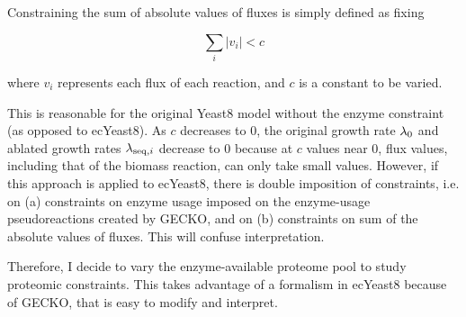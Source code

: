 Constraining the sum of absolute values of fluxes is simply defined as fixing

\begin{equation}
  \sum_{i} |v_{i}| < c
  \label{eq:model-constrain-sumfluxes}
\end{equation}

where $v_{i}$ represents each flux of each reaction, and $c$ is a constant to be varied.

This is reasonable for the original Yeast8 model without the enzyme constraint (as opposed to ecYeast8).
As $c$ decreases to 0, the original growth rate $\lambda_{0}$ and ablated growth rates $\lambda_{\mathrm{seq},i}$ decrease to 0 because at $c$ values near 0, flux values, including that of the biomass reaction, can only take small values.
However, if this approach is applied to ecYeast8,
there is double imposition of constraints, i.e.\: on
(a) constraints on enzyme usage imposed on the enzyme-usage pseudoreactions created by GECKO, and on
(b) constraints on sum of the absolute values of fluxes.
This will confuse interpretation.

Therefore, I decide to vary the enzyme-available proteome pool to study proteomic constraints.
This takes advantage of a formalism in ecYeast8 because of GECKO, that is easy to modify and interpret.


